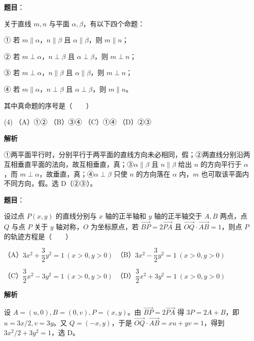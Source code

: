 \begin{answer}

\textbf{题目}：

关于直线 $m,n$ 与平面 $\alpha,\beta$，有以下四个命题：

① 若 $m\parallel\alpha$，$n\parallel\beta$ 且 $\alpha\parallel\beta$，则 $m\parallel n$；

② 若 $m\perp\alpha$，$n\perp\beta$ 且 $\alpha\perp\beta$，则 $m\perp n$；

③ 若 $m\perp\alpha$，$n\parallel\beta$ 且 $\alpha\parallel\beta$，则 $m\perp n$；

④ 若 $m\parallel\alpha$，$n\perp\beta$ 且 $\alpha\perp\beta$，则 $m\parallel n$。

其中真命题的序号是\mbox{（　　）}

\begin{gkopts}(4)
\task （A）①②
\task （B）③④
\task （C）①④
\task （D）②③
\end{gkopts}

\textbf{解析}

①两平面平行时，分别平行于两平面的直线方向未必相同，假；②两直线分别沿两互相垂直平面的法向，故互相垂直，真；③$\alpha\parallel\beta$ 且 $n\parallel\beta$ 给出 $n$ 的方向平行于 $\alpha$，而 $m\perp\alpha$，故垂直，真；④$\alpha\perp\beta$ 只使 $n$ 的方向落在 $\alpha$ 内，$m$ 也可取该平面内不同方向，假。选 D（②③）。


\end{answer}
\begin{answer}

\textbf{题目}：

设过点 $P(x,y)$ 的直线分别与 $x$ 轴的正半轴和 $y$ 轴的正半轴交于 $A,B$ 两点，点 $Q$ 与点 $P$ 关于 $y$ 轴对称，$O$ 为坐标原点，若 $\overrightarrow{BP}=2\overrightarrow{PA}$ 且 $\overrightarrow{OQ}\cdot\overrightarrow{AB}=1$，则点 $P$ 的轨迹方程是\mbox{（　　）}

（A）$3x^2+\dfrac32y^2=1\ (x>0,y>0)$　（B）$3x^2-\dfrac32y^2=1\ (x>0,y>0)$

（C）$\dfrac32x^2-3y^2=1\ (x>0,y>0)$　（D）$\dfrac32x^2+3y^2=1\ (x>0,y>0)$

\textbf{解析}

设 $A=(u,0),B=(0,v),P=(x,y)$。由 $\overrightarrow{BP}=2\overrightarrow{PA}$ 得 $3P=2A+B$，即 $u=3x/2,v=3y$。又 $Q=(-x,y)$，于是 $\overrightarrow{OQ}\cdot\overrightarrow{AB}=xu+yv=1$，得到 $3x^2/2+3y^2=1$，选 D。


\end{answer}
